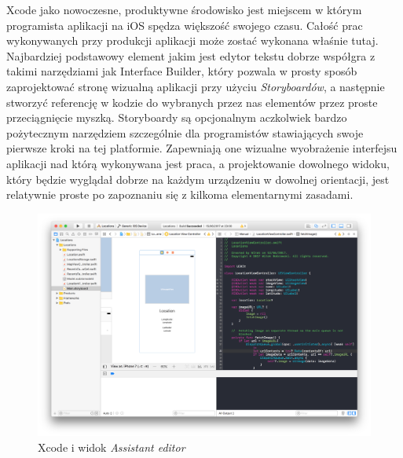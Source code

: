 Xcode jako nowoczesne, produktywne środowisko jest miejscem w którym programista aplikacji na iOS spędza większość swojego czasu. Całość prac wykonywanych przy produkcji aplikacji może zostać wykonana właśnie tutaj. Najbardziej podstawowy element jakim jest edytor tekstu dobrze współgra z takimi narzędziami jak Interface Builder, który pozwala w prosty sposób zaprojektować stronę wizualną aplikacji przy użyciu \textit{Storyboardów}, a następnie stworzyć referencję w kodzie do wybranych przez nas elementów przez proste przeciągnięcie myszką. Storyboardy są opcjonalnym aczkolwiek bardzo pożytecznym narzędziem szczególnie dla programistów stawiających swoje pierwsze kroki na tej platformie. Zapewniają one wizualne wyobrażenie interfejsu aplikacji nad którą wykonywana jest praca, a projektowanie dowolnego widoku, który będzie wyglądał dobrze na każdym urządzeniu w dowolnej orientacji, jest relatywnie proste po zapoznaniu się z kilkoma elementarnymi zasadami.

\begin{figure}[ht!]
  \centering
  \includegraphics[width=120mm]{images/chapter-2-image-2-xcode.png}
  \caption{Xcode i widok \textit{Assistant editor}}
\end{figure}

